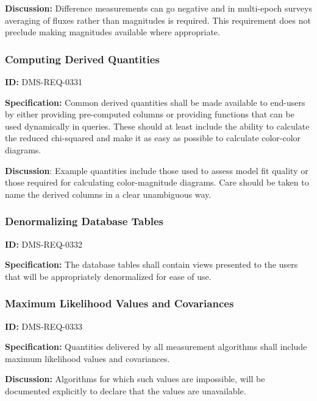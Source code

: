\documentclass[SE,toc,lsstdraft]{lsstdoc}
\begin{document}
\textbf{Discussion: }Difference measurements can go negative and in multi-epoch surveys averaging of fluxes rather than magnitudes is required. This requirement does not preclude making magnitudes available where appropriate.




\subsubsection{Computing Derived Quantities}

\label{DMS-REQ-0331}
\textbf{ID:} DMS-REQ-0331

\textbf{Specification:} Common derived quantities shall be made available to end-users by either providing pre-computed columns or providing functions that can be used dynamically in queries. These should at least include the ability to calculate the reduced chi-squared and make it as easy as possible to calculate color-color diagrams.

\textbf{Discussion}: Example quantities include those used to assess model fit quality or those required for calculating color-magnitude diagrams. Care should be taken to name the derived columns in a clear unambiguous way.




\subsubsection{Denormalizing Database Tables}

\label{DMS-REQ-0332}
\textbf{ID:} DMS-REQ-0332

\textbf{Specification:} The database tables shall contain views presented to the users that will be appropriately denormalized for ease of use.






\subsubsection{Maximum Likelihood Values and Covariances}

\label{DMS-REQ-0333}
\textbf{ID:} DMS-REQ-0333

\textbf{Specification:} Quantities delivered by all measurement algorithms shall include maximum likelihood values and covariances.

\textbf{Discussion:} Algorithms for which such values are impossible, will be documented explicitly to declare that the values are unavailable.
\end{document}
